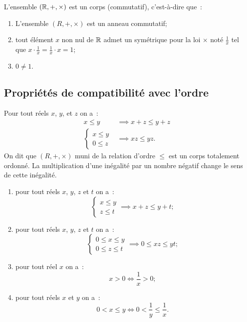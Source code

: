\begin{prop}
  L'ensemble \((\mathbb{R}, +, \times)\) est un corps (commutatif), c'est-à-dire que~:
  \begin{enumerate}
    \item L'ensemble \((R, +, \times)\) est un anneau commutatif;
    \item tout élément \(x\) non nul de \(\mathbb{R}\) admet un symétrique pour la loi 
      \(\times\) noté \(\frac{1}{x}\) tel que \(x\cdot \frac{1}{x} = 
      \frac{1}{x}\cdot x = 1\);
    \item \(0\neq 1\).
  \end{enumerate}
\end{prop}

\subsection{Propriétés de compatibilité avec l'ordre}

\begin{prop}
  Pour tout réels \(x\), \(y\), et \(z\) on a~:
  \begin{align}
    x\leqslant y &\implies x + z\leqslant y + z \\
    \begin{cases} x\leqslant y \\ 0\leqslant z \end{cases} &\implies xz 
    \leqslant yz.
  \end{align}
  On dit que \((R, +, \times)\) muni de la relation d'ordre \(\leqslant\) est un 
  corps totalement ordonné. La multiplication d'une inégalité par un nombre 
  négatif change le sens de cette inégalité.
\end{prop}
\begin{enumerate}
  \item pour tout réels \(x\), \(y\), \(z\) et \(t\) on a~:
    \begin{equation}
      \begin{cases}
      x\leqslant y \\ z \leqslant t \end{cases} \implies x + z\leqslant y + t;  
    \end{equation}
  \item pour tout réels \(x\), \(y\), \(z\) et \(t\) on a~:
    \begin{equation}
      \begin{cases}
      0 \leqslant x\leqslant y \\ 0 \leqslant z \leqslant t \end{cases} \implies 
      0\leqslant xz \leqslant yt;
    \end{equation}
  \item pour tout réel \(x\) on a~:
    \begin{equation}
      x > 0 \iff \frac{1}{x} > 0;
    \end{equation}
  \item pour tout réels \(x\) et \(y\) on a~:
    \begin{equation}
      0 < x \leqslant y \iff 0 < \frac{1}{y} \leqslant \frac{1}{x}.
    \end{equation}
\end{enumerate}

